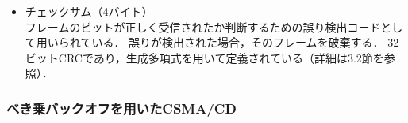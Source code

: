 \documentclass[a4paper]{ltjsarticle}
\begin{document}
\begin{itemize}
\begin{itemize}
    \begin{itemize}
    \item
      衝突を検知したとき，送信中のフレームの送信は打ち切られるため，バラバラとなったビットとフレームのかけらがいくつもケーブル上に存在してしまう．
      もしデータが極端に短いフレームが送信されると，これらと見分けがつきにくい．
    \item
      送信した最初のビットがケーブルの終端へ到着する前にフレームの送信が終了してしまうと，送信側が衝突を検知する前に送信が正常に終了したと誤認する恐れがある．
      そのため，衝突を検知したときにフレームを送信しておくためには，送信時間を終端までの遅延時間の2倍以上とする必要がある．
    \end{itemize}
  \item
    パッド\\
    フレームが終端に到着する遅延時間を\(\tau\)とする．
    上記より，すべてのフレームは送信に\(2\tau\)以上の時間をかけなければならない．
    \SI{2.5}{km}の最長距離と4つのリピータを持つ約10Mビット/秒のLANでは，リピータの遅延時間を含めラウンド・トリップ時間は最悪の場合で約\SI{50}{\micro s}と算出される．
    1ビットの転送に\SI{100}{\nano s}かかるため，最小のフレーム長は500ビットとなる．
    いくらかの余裕を付加して，512ビット（64バイト）に丸められる．
    データフィールドまでのフィールドの長さを合計すると，22バイトであるため，差し引き46バイト必要である．
    よって，データフィールドが46バイト未満であるとき，不足分をパッドフィールドで埋め合わせる．
  \end{itemize}
\item
  チェックサム（4バイト）\\
  フレームのビットが正しく受信されたか判断するための誤り検出コードとして用いられている．
  誤りが検出された場合，そのフレームを破棄する．
  32ビットCRCであり，生成多項式を用いて定義されている（詳細は3.2節を参照）．
\end{itemize}

\subsubsection{べき乗バックオフを用いたCSMA/CD}\label{ux3079ux304dux4e57ux30d0ux30c3ux30afux30aaux30d5ux3092ux7528ux3044ux305fcsmacd}
\end{document}
